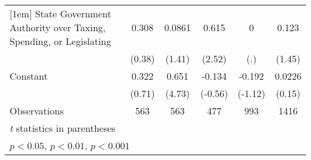 {\begin{tabular}{l*{5}{c}}
[1em]
State Government Authority over Taxing, Spending, or Legislating&    0.308         &   0.0861         &    0.615\sym{*}  &        0         &    0.123         \\
                &   (0.38)         &   (1.41)         &   (2.52)         &      (.)         &   (1.45)         \\
[1em]
Constant        &    0.322         &    0.651\sym{***}&   -0.134         &   -0.192         &   0.0226         \\
                &   (0.71)         &   (4.73)         &  (-0.56)         &  (-1.12)         &   (0.15)         \\
\hline
Observations    &      563         &      563         &      477         &      993         &     1416         \\
\hline\hline
\multicolumn{6}{l}{\footnotesize \textit{t} statistics in parentheses}\\
\multicolumn{6}{l}{\footnotesize \sym{*} \(p<0.05\), \sym{**} \(p<0.01\), \sym{***} \(p<0.001\)}\\
\end{tabular}
}
